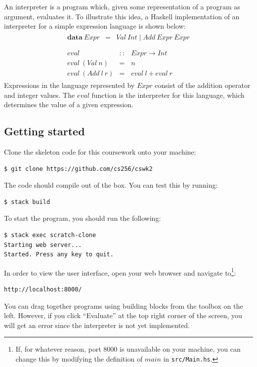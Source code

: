 \documentclass{cs256-shared/cs256}
\begin{document}
An interpreter is a program which, given some representation of a program as argument, evaluates it. To illustrate this idea, a Haskell implementation of an interpreter for a simple expression language is shown below:
\begin{displaymath}
\begin{array}{l}
\begin{array}{lcl}
\mathbf{data}~\mathit{Expr} & = & \mathit{Val}~\mathit{Int} \mid \mathit{Add}~\mathit{Expr}~\mathit{Expr}
\end{array} \\\\
\begin{array}{lcl}
\mathit{eval} & :: & \mathit{Expr} \to \mathit{Int} \\
\mathit{eval}~(\mathit{Val}~n) & = & n\\
\mathit{eval}~(\mathit{Add}~l~r) & = & \mathit{eval}~l + \mathit{eval}~r
\end{array}
\end{array}
\end{displaymath}
Expressions in the language represented by $\mathit{Expr}$ consist of the addition operator and integer values. The $\mathit{eval}$ function is the interpreter for this language, which determines the value of a given expression.

\subsection*{Getting started}

Clone the skeleton code for this coursework onto your machine:
\begin{verbatim}
$ git clone https://github.com/cs256/cswk2
\end{verbatim}
The code should compile out of the box. You can test this by running:
\begin{verbatim}
$ stack build
\end{verbatim}
To start the program, you should run the following:
\begin{verbatim}
$ stack exec scratch-clone
Starting web server...
Started. Press any key to quit.
\end{verbatim}
In order to view the user interface, open your web browser and navigate to\footnote{If, for whatever reason, port 8000 is unavailable on your machine, you can change this by modifying the definition of $\mathit{main}$ in \texttt{src/Main.hs}.}:
\begin{verbatim}
http://localhost:8000/
\end{verbatim}
You can drag together programs using building blocks from the toolbox on the left. However, if you click ``Evaluate'' at the top right corner of the screen, you will get an error since the interpreter is not yet implemented.
\end{document}
